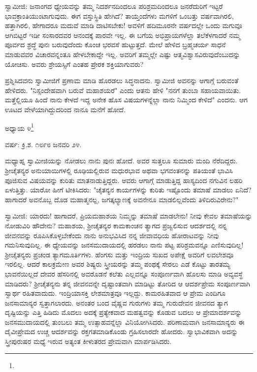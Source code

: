ಸ್ವಾಮೀಜಿ: ಜನಾಂಗದ ಧ್ಯೇಯವನ್ನು ತಮ್ಮ ನಿದರ್ಶನದಿಂದಲೂ ಪರಿಶ್ರಮದಿಂದಲೂ ಜನರೆದುರಿಗೆ ಇಟ್ಟರೆ ಭಾವಕ್ರಾಂತಿಯುಂಟಾಗುವುದು. ಈಗ ವಸ್ತುಸ್ಥಿತಿ ಹೇಗಿದೆ? ತಾಯ್ತಂದೆಗಳು ಮಗಳಿಗೆ ಒಂಬತ್ತು ವರ್ಷವಾಗಿರಲಿ, ಹತ್ತಾಗಿರಲಿ, ಹೇಗಾದರೂ ಮದುವೆ ಮಾಡಿ ದಾಟಿಸಬೇಕು! ಅವಳಿಗೆ ಹದಿಮೂರನೇ ವರ್ಷದಲ್ಲೇ ಒಂದು ಮಗುವೂ ಆಗಿಬಿಟ್ಟರೆ ಇಡೀ ಸಂಸಾರದವರ ಆನಂದಕ್ಕೆ ಪಾರವೇ ಇಲ್ಲ. ಈ ಬಗೆಯ ಅಭಿಪ್ರಾಯಗಳೆಲ್ಲಾ ತಲೆಕೆಳಗಾದರೆ ನಮ್ಮ ಪೂರ್ವದ ಶ್ರದ್ಧೆ ಪುನಃ ಬರುವುದೆಂದು ಕೊಂಚ ಭರವಸೆ ಹುಟ್ಟುತ್ತದೆ. ಮೇಲೆ ಹೇಳಿದ ಬ್ರಹ್ಮಚರ್ಯ ಸಾಧನೆ ಮಾಡುವವರ ವಿಚಾರವನ್ನಂತೂ ಹೇಳಬೇಕಾದ್ದೇ ಇಲ್ಲ. ಅವರಿಗೆ ತಮ್ಮಲ್ಲೇ ಎಷ್ಟು ಆತ್ಮವಿಶ್ವಾಸವಿರುವುದೆಂಬುದನ್ನು ಯೋಚಿಸು. ಅವರು ಶ್ರೇಯಸ್ಸಿಗೆ ಎಂತಹ ಪ್ರೇರಕ ಶಕ್ತಿಯಾಗುವರು?

ಪ್ರಶ್ನಿಸಿದವನು ಸ್ವಾಮೀಜಿಗೆ ಪ್ರಣಾಮ ಮಾಡಿ ಹೊರಡಲು ಸಿದ್ಧನಾದನು. ಸ್ವಾಮೀಜಿ ಅವನನ್ನು ಆಗಾಗ್ಗೆ ಬರುವಂತೆ ಹೇಳಿದರು. "ನಿಸ್ಸಂದೇಹವಾಗಿ ಬರುವೆ ಮಹಾಶಯರೆ" ಎಂದು ಆತನು ಹೇಳಿ "ನನಗೆ ತುಂಬಾ ಸಹಾಯವಾಯಿತು. ಮತ್ತೆಲ್ಲಿಯೂ ಹಿಂದೆ ನಾನು ಕೇಳದೆ ಇದ್ದ ಅನೇಕ ಹೊಸ ವಿಷಯಗಳನ್ನೆಲ್ಲಾ ನಾನು ನಿಮ್ಮಿಂದ ಕೇಳಿದೆ" ಎಂದನು. ಆಗ ಊಟದ ವೇಳೆಯಾಗಿದ್ದುದರಿಂದ ನಾನೂ ಮನೆಗೆ ಹೋದೆ.

ಅಧ್ಯಾಯ ೪\protect\footnote{}

\begin{center}
ವರ್ಷ: ಕ್ರಿ.ಶ. ೧೮೯೮ ಜನವರಿ ೨೪.
\end{center}

ಮಧ್ಯಾಹ್ನ ಸ್ವಾಮೀಜಿಯನ್ನು ನೋಡಲು ನಾನು ಪುನಃ ಹೋದೆ. ಅವರ ಸುತ್ತಲೂ ಸುಮಾರು ಮಂದಿ ನೆರೆದಿದ್ದರು. ಶ‍್ರೀಚೈತನ್ಯರ ಅನುಯಾಯಿಗಳಲ್ಲಿ ರೂಢಿಯಲ್ಲಿರುವ ಮಧುರಭಾವ ಅಥವಾ ಭಗವಂತನನ್ನು ಪತಿಯಂತೆ ಭಾವಿಸಿ ಪೂಜಿಸುವ ವಿಷಯವನ್ನು ಕುರಿತು ಮಾತನಾಡುತ್ತಿದ್ದರು. ಅವರು ಆಗಾಗ್ಗೆ ಮಾಡುತ್ತಿದ್ದ ಹಾಸ್ಯದಿಂದ ನಗುವಿನ ಲಹರಿ ಏಳುತ್ತಿತ್ತು. ಯಾರೋ ಹೀಗೆ ಟೀಕಿಸಿದರು: "ಚೈತನ್ಯನ ಕಾರ್ಯಗಳನ್ನು ಕುರಿತು ಇಷ್ಟೊಂದು ತಮಾಷೆ ಮಾಡಲು ಏನಿದೆ? ಹಾಗಾದರೆ ಅವನೊಬ್ಬ ದೊಡ ಮಹಾತ್ಮನಲ್ಲ, ಜಗತ್ಕಲ್ಯಾಣಕ್ಕೆ ಅವನೇನೂ ಮಾಡಲಿಲ್ಲವೆಂದು ತಿಳಿದಿರುವಿರೇನು?"

ಸ್ವಾಮೀಜಿ: ಯಾರದು! ಹಾಗಾದರೆ, ಪ್ರಿಯಮಹಾಶಯ ನಿಮ್ಮನ್ನು ತಮಾಷೆ ಮಾಡಲೇನು! ನೀವು ಕೇವಲ ತಮಾಷೆಯನ್ನು ನೋಡುವಿರಿ ಹೌದೇನು? ಮಹಾಶಯ, ಶ‍್ರೀಚೈತನ್ಯರ ಕಾಮಕಾಂಚನ ತ್ಯಾಗದ ಪ್ರಜ್ವಲಿಸುವ ಆದರ್ಶದಲ್ಲಿ ನನ್ನ ಜೀವನವನ್ನು ರೂಪಿಸಿಕೊಳ್ಳಬೇಕೆಂದು ನಾನು ಅನುಭವಿಸಿದ ನನ್ನ ಜೀವಾವಧಿಯ ಹೋರಾಟವನ್ನು ನೀವು ಗಮನಿಸುವುದಿಲ್ಲ. ಈ ಧ್ಯೇಯವನ್ನು ಜನಸಮುದಾಯದಲ್ಲಿ ಹರಡಲು ನಾನು ಪಟ್ಟ ಪರಿಶ್ರಮವನ್ನೂ ಎಣಿಸುವುದಿಲ್ಲ! ಶ‍್ರೀಚೈತನ್ಯರು ಪ್ರಚಂಡ ತ್ಯಾಗಮೂರ್ತಿಗಳು. ಹೆಂಗಸು ಮತ್ತು ಇಂದ್ರಿಯ ಸುಖದ ಅಪೇಕ್ಷೆ ಅವರಿಗೆ ಲವಲೇಶವೂ ಇರಲಿಲ್ಲ. ಆದರೆ ಕಾಲಕ್ರಮೇಣ ಅವರ ಶಿಷ್ಯರು ಸ್ತ್ರೀಯರನ್ನು ತಮ್ಮ ಪಂಥಕ್ಕೆ ಸೇರಲು ಎಡೆ ಕೊಟ್ಟು ತಾರತಮ್ಯ ಭಾವನೆಯಿಲ್ಲದೆ ದೇವರ ಹೆಸರಿನಲ್ಲಿ ಅವರೊಡನೆ ಕಲೆತು ಎಲ್ಲವನ್ನೂ ಸಂಪೂರ್ಣವಾಗಿ ಹೊಲಸು ಮಾಡಿ ಅವ್ಯವಸ್ಥೆ ಮಾಡಿದರು? ಶ‍್ರೀಚೈತನ್ಯನು ತನ್ನ ಜೀವನವನ್ನೇ ದೃಷ್ಟಾಂತವಾಗಿ ಮಾಡಿಟ್ಟು ತೋರಿದ ಆ ಆದರ್ಶಪ್ರೇಮ ಸಂಪೂರ್ಣವಾಗಿ ಸ್ವಾರ್ಥ ರಹಿತವಾದುದು. ಇಂದ್ರಿಯಾಸಕ್ತಿ ಲೇಶಮಾತ್ರವೂ ಇಲ್ಲದ್ದು. ಕಾಮರಹಿತವಾದ ಆ ಪ್ರೇಮ ಎಂದಿಗೂ ಜನಸಾಮಾನ್ಯರ ಸ್ವತ್ತಾಗಲಾರದು. ಅನಂತರ ಬಂದ ವೈಷ್ಣವ ಗುರುಗಳು ತಮ್ಮ ಗುರುದೇವನ ಜೀವನದ ತ್ಯಾಗ ದೃಷ್ಟಿಯನ್ನು ಎತ್ತಿ ಹಿಡಿದು ಮೊದಲು ಅದಕ್ಕೆ ಪ್ರತ್ಯೇಕವಾದ ಮಹತ್ವವನ್ನು ಕೊಡುವ ಬದಲು ಆ ಪ್ರೇಮಾದರ್ಶವನ್ನು ಜನಸಮುದಾಯದಲ್ಲಿ ತುಂಬಲು ತಮ್ಮ ಉತ್ಸಾಹವನ್ನೆಲ್ಲಾ ವಿನಿಯೋಗಿಸಿದರು. ಪರಿಣಾಮವಾಗಿ ಜನಸಾಮಾನ್ಯರು ಈ ದೈವೀಪ್ರೇಮದ ಉಚ್ಚ ಆದರ್ಶವನ್ನು ರಕ್ತಗತಮಾಡಿಕೊಂಡು ಗ್ರಹಿಸಲಾರದೇ ಹೋದರು. ಸ್ವಾಭಾವಿಕವಾಗಿ ಅದನ್ನು ಸ್ತ್ರೀಪುರುಷರ ಮಧ್ಯೆ ಇರುವ ಅತ್ಯಂತ ಕೀಳುತರದ ಪ್ರೇಮವಾಗಿ ಮಾರ್ಪಡಿಸಿದರು.

